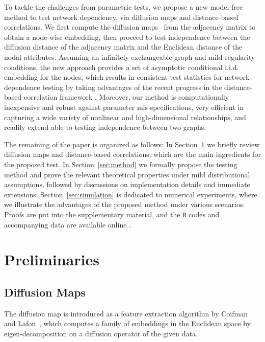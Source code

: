 \documentclass[12pt]{article}
\theoremstyle{definition}
\begin{document}
	To tackle the challenges from parametric tests, we propose a new model-free method to test network dependency, via diffusion maps and distance-based correlations. We first compute the diffusion maps~\citep{coifman2005geometric,coifman2006diffusion,lafon2006diffusion} from the adjacency matrix to obtain a node-wise embedding, then proceed to test independence between the diffusion distance of the adjacency matrix and the Euclidean distance of the nodal attributes. Assuming an infinitely exchangeable graph and mild regularity conditions, the new approach provides a set of asymptotic conditional i.i.d. embedding for the nodes, which results in consistent test statistics for network dependence testing by taking advantages of the recent progress in the distance-based correlation framework \citep{szekely2007measuring,szekelyRizzo2013a, shen2016discovering}. Moreover, our method is computationally inexpensive and robust against parameter mis-specifications, very efficient in capturing a wide variety of nonlinear and high-dimensional relationships, and readily extend-able to testing independence between two graphs. 
	
	The remaining of the paper is organized as follows: In Section~\ref{sec:pre} we briefly review diffusion maps and distance-based correlations, which are the main ingredients for the proposed test. In Section~\ref{sec:method} we formally propose the testing method and prove the relevant theoretical properties under mild distributional assumptions, followed by discussions on implementation details and immediate extensions. Section~\ref{sec:simulation} is dedicated to numerical experiments, where we illustrate the advantages of the proposed method under various scenarios. Proofs are put into the supplementary material, and the \texttt{R} codes and accompanying data are available online \footnotemark{}.
	
	
	\section{Preliminaries}
	\label{sec:pre}
	\subsection{Diffusion Maps}
	\label{ssec:method2}
	
	The diffusion map is introduced as a feature extraction algorithm by Coifman and Lafon~\citep{coifman2005geometric,coifman2006diffusion,lafon2006diffusion}, which computes a family of embeddings in the Euclidean space by eigen-decomposition on a diffusion operator of the given data. 
	
\end{document}
